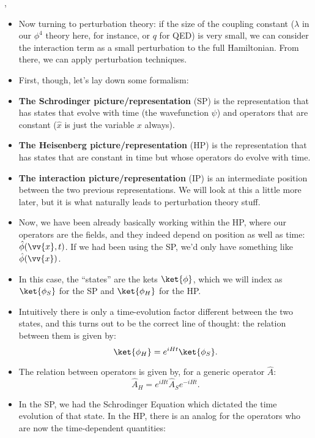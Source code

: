 \sep 

\begin{itemize}
    \item Now turning to perturbation theory: if the size of the coupling constant ($\lambda$ in our $\phi^4$ theory here, for instance, or $q$ for QED) is very small, we can consider the interaction term as a small perturbation to the full Hamiltonian. From there, we can apply perturbation techniques.
    \item First, though, let's lay down some formalism:
    \item \textbf{The Schrodinger picture/representation} (SP) is the representation that has states that evolve with time (the wavefunction $\psi$) and operators that are constant ($\hat{x}$ is just the variable $x$ always).
    \item \textbf{The Heisenberg picture/representation} (HP) is the representation that has states that are constant in time but whose operators do evolve with time.
    \item \textbf{The interaction picture/representation} (IP) is an intermediate position between the two previous representations. We will look at this a little more later, but it is what naturally leads to perturbation theory stuff.
    \item Now, we have been already basically working within the HP, where our operators are the fields, and they indeed depend on position as well as time: $\hat{\phi}(\vv{x},t)$. If we had been using the SP, we'd only have something like $\hat{\phi}(\vv{x})$.
    \item In this case, the ``states'' are the kets $\ket{\phi}$, which we will index as $\ket{\phi_S}$ for the SP and $\ket{\phi_H}$ for the HP.
    \item Intuitively there is only a time-evolution factor different between the two states, and this turns out to be the correct line of thought: the relation between them is given by:
        \begin{equation}
            \ket{\phi_H} = e^{iHt} \ket{\phi_S}.\label{eq:SPandHPStateRelation}
        \end{equation}
    \item The relation between operators is given by, for a generic operator $\hat{A}$:
        \begin{equation}
            \hat{A}_H = e^{iHt} \hat{A}_S e^{-iHt}.
        \end{equation}
    \item In the SP, we had the Schrodinger Equation which dictated the time evolution of that state. In the HP, there is an analog for the operators who are now the time-dependent quantities:

\end{itemize}
